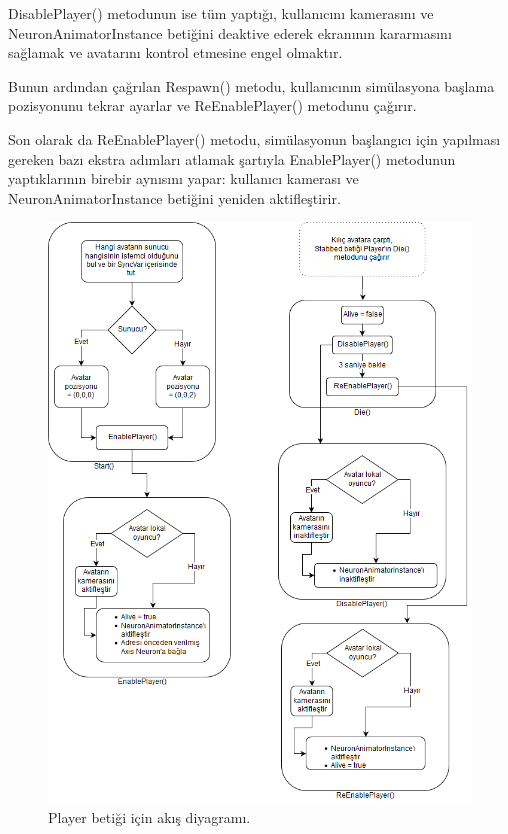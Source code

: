 \documentclass[a4paper, 12pt, titlepage]{article}
\begin{document}
DisablePlayer() metodunun ise tüm yaptığı, kullanıcını kamerasını ve NeuronAnimatorInstance
betiğini deaktive ederek ekranının kararmasını sağlamak ve avatarını kontrol etmesine engel
olmaktır.

Bunun ardından çağrılan Respawn() metodu, kullanıcının simülasyona başlama pozisyonunu tekrar
ayarlar ve ReEnablePlayer() metodunu çağırır.

Son olarak da ReEnablePlayer() metodu, simülasyonun başlangıcı için yapılması gereken bazı ekstra
adımları atlamak şartıyla EnablePlayer() metodunun yaptıklarının birebir aynısını yapar: kullanıcı
kamerası ve NeuronAnimatorInstance betiğini yeniden aktifleştirir.

\begin{figure}[hbt!]
    \centering
        \includegraphics[width=6in]{images/player}
    \caption{Player betiği için akış diyagramı.}
    \label{player}
\end{figure}
\end{document}
